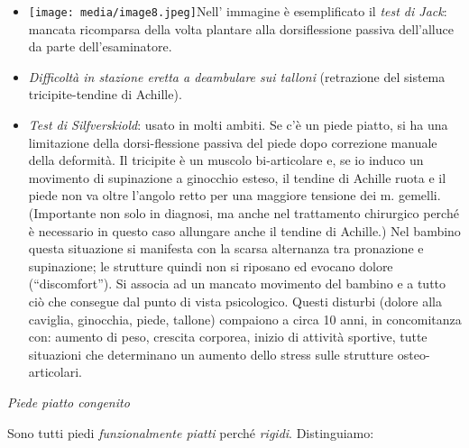 \documentclass[]{article}
\begin{document}
\begin{itemize}
\item
  \texttt{[image: media/image8.jpeg]}Nell'
  immagine è esemplificato il \emph{test di Jack}: mancata ricomparsa
  della volta plantare alla dorsiflessione passiva dell'alluce da parte
  dell'esaminatore.
\item
  \emph{Difficoltà in stazione eretta a deambulare sui talloni}
  (retrazione del sistema tricipite-tendine di Achille).
\item
  \emph{Test di Silfverskiold}: usato in molti ambiti. Se c'è un piede
  piatto, si ha una limitazione della dorsi-flessione passiva del piede
  dopo correzione manuale della deformità. Il tricipite è un muscolo
  bi-articolare e, se io induco un movimento di supinazione a ginocchio
  esteso, il tendine di Achille ruota e il piede non va oltre l'angolo
  retto per una maggiore tensione dei m. gemelli. (Importante non solo
  in diagnosi, ma anche nel trattamento chirurgico perché è necessario
  in questo caso allungare anche il tendine di Achille.) Nel bambino
  questa situazione si manifesta con la scarsa alternanza tra pronazione
  e supinazione; le strutture quindi non si riposano ed evocano dolore
  (``discomfort''). Si associa ad un mancato movimento del bambino e a
  tutto ciò che consegue dal punto di vista psicologico. Questi disturbi
  (dolore alla caviglia, ginocchia, piede, tallone) compaiono a circa 10
  anni, in concomitanza con: aumento di peso, crescita corporea, inizio
  di attività sportive, tutte situazioni che determinano un aumento
  dello stress sulle strutture osteo-articolari.
\end{itemize}

\emph{Piede piatto congenito}

Sono tutti piedi \emph{funzionalmente piatti} perché \emph{rigidi}.
Distinguiamo:
\end{document}
